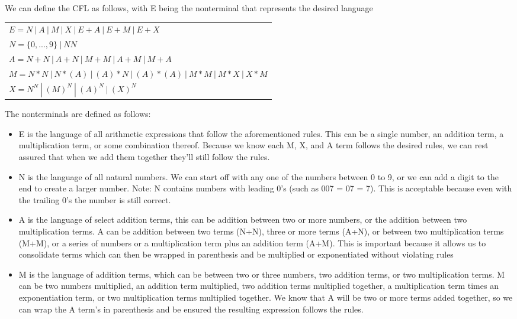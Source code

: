 \documentclass[11pt, letterpaper]{article}
\begin{document}
\begin{enumerate}[label=\Alph*]
We can define the CFL as follows, with E being the nonterminal that represents the desired language

\begin{center}
\begin{tabular}{l}

$E = N\ |\ A\ |\ M\ |\ X\ |\ E + A\ |\ E+M\ |\ E+X $ \\
$N = \{0,...,9\}\ |\ NN $ \\
$A = N + N\ |\ A + N\ |\ M+M\ |\ A+M\ |\ M+A$ \\
$M = N*N\ |\ N*(A)\ |\ (A)*N\ |\ (A)*(A)\ |\ M*M\ |\ M*X\ |\ X*M $ \\
$X = N^N\ |\ (M)^N\ |\ (A)^N\ |\ (X)^N $ \\

\end{tabular}
\end{center}

\quad The nonterminals are defined as follows:

\begin{itemize}

\item E is the language of all arithmetic expressions that follow the aforementioned rules. This can be a single number, an addition term, a multiplication term, or some combination thereof. Because we know each M, X, and A term follows the desired rules, we can rest assured that when we add them together they'll still follow the rules.

\item N is the language of all natural numbers. We can start off with any one of the numbers between 0 to 9, or we can add a digit to the end to create a larger number. Note: N contains numbers with leading 0's (such as 007 = 07 = 7). This is acceptable because even with the trailing 0's the number is still correct.

\item A is the language of select addition terms, this can be addition between two or more numbers, or the addition between two multiplication terms. A can be addition between two terms (N+N), three or more terms (A+N), or between two multiplication terms (M+M), or a series of numbers or a multiplication term plus an addition term (A+M). This is important because it allows us to consolidate terms which can then be wrapped in parenthesis and be multiplied or exponentiated without violating rules

\item M is the language of addition terms, which can be between two or three numbers, two addition terms, or two multiplication terms. M can be two numbers multiplied, an addition term multiplied, two addition terms multiplied together, a multiplication term times an exponentiation term, or two multiplication terms multiplied together. We know that A will be two or more terms added together, so we can wrap the A term's in parenthesis and be ensured the resulting expression follows the rules.


\end{itemize}
\end{enumerate}
\end{document}
